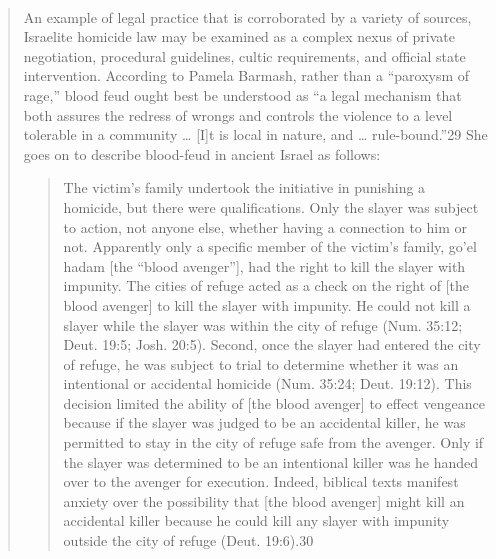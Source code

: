 \documentclass[11pt]{article}
\begin{document}
\
\begin{quote}
An example of legal practice that is corroborated by a variety of sources, Israelite homicide law may be examined as a complex nexus of private negotiation, procedural guidelines, cultic requirements, and official state intervention. According to Pamela Barmash, rather than a “paroxysm of rage,” blood feud ought best be understood as “a legal mechanism that both assures the redress of wrongs and controls the violence to a level tolerable in a community … [I]t is local in nature, and … rule-bound.”29 She goes on to describe blood-feud in ancient Israel as follows:
\begin{quote}

The victim’s family undertook the initiative in punishing a homicide, but there were qualifications. Only the slayer was subject to action, not anyone else, whether having a connection to him or not. Apparently only a specific member of the victim’s family, go’el hadam [the “blood avenger”], had the right to kill the slayer with impunity. The cities of refuge acted as a check on the right of [the blood avenger] to kill the slayer with impunity. He could not kill a slayer while the slayer was within the city of refuge (Num. 35:12; Deut. 19:5; Josh. 20:5). Second, once the slayer had entered the city of refuge, he was subject to trial to determine whether it was an intentional or accidental homicide (Num. 35:24; Deut. 19:12). This decision limited the ability of [the blood avenger] to effect vengeance because if the slayer was judged to be an accidental killer, he was permitted to stay in the city of refuge safe from the avenger. Only if the slayer was determined to be an intentional killer was he handed over to the avenger for execution. Indeed, biblical texts manifest anxiety over the possibility that [the blood avenger] might kill an accidental killer because he could kill any slayer with impunity outside the city of refuge (Deut. 19:6).30 
\end{quote}


\end{quote}
\end{document}
